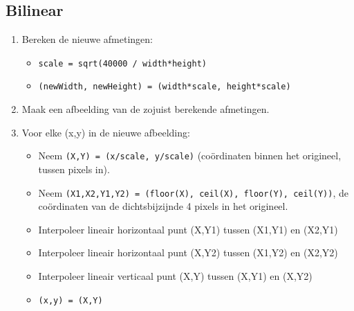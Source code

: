 \documentclass[a4paper]{article}
\begin{document}
\subsection{Bilinear}
\label{sec:org31de6c6}
\begin{enumerate}
\item Bereken de nieuwe afmetingen:
\begin{itemize}
\item \texttt{scale = sqrt(40000 / width*height)}
\item \texttt{(newWidth, newHeight) = (width*scale, height*scale)}
\end{itemize}
\item Maak een afbeelding van de zojuist berekende afmetingen.
\item Voor elke (x,y) in de nieuwe afbeelding:
\begin{itemize}
\item Neem \texttt{(X,Y) = (x/scale, y/scale)} (coördinaten binnen het
origineel, tussen pixels in).
\item Neem \texttt{(X1,X2,Y1,Y2) = (floor(X), ceil(X), floor(Y), ceil(Y))}, de
coördinaten van de dichtsbijzijnde 4 pixels in het origineel.
\item Interpoleer lineair horizontaal punt (X,Y1) tussen (X1,Y1) en (X2,Y1)
\item Interpoleer lineair horizontaal punt (X,Y2) tussen (X1,Y2) en (X2,Y2)
\item Interpoleer lineair verticaal punt (X,Y) tussen (X,Y1) en (X,Y2)
\item \texttt{(x,y) = (X,Y)}
\end{itemize}
\end{enumerate}
\end{document}
